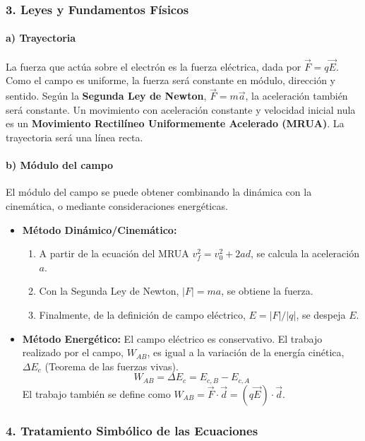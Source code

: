 \subsubsection*{3. Leyes y Fundamentos Físicos}
\paragraph*{a) Trayectoria}
La fuerza que actúa sobre el electrón es la fuerza eléctrica, dada por $\vec{F} = q\vec{E}$. Como el campo es uniforme, la fuerza será constante en módulo, dirección y sentido. Según la \textbf{Segunda Ley de Newton}, $\vec{F} = m\vec{a}$, la aceleración también será constante. Un movimiento con aceleración constante y velocidad inicial nula es un \textbf{Movimiento Rectilíneo Uniformemente Acelerado (MRUA)}. La trayectoria será una línea recta.

\paragraph*{b) Módulo del campo}
El módulo del campo se puede obtener combinando la dinámica con la cinemática, o mediante consideraciones energéticas.
\begin{itemize}
    \item \textbf{Método Dinámico/Cinemático:}
        \begin{enumerate}
            \item A partir de la ecuación del MRUA $v_f^2 = v_0^2 + 2ad$, se calcula la aceleración $a$.
            \item Con la Segunda Ley de Newton, $|F| = ma$, se obtiene la fuerza.
            \item Finalmente, de la definición de campo eléctrico, $E = |F|/|q|$, se despeja $E$.
        \end{enumerate}
    \item \textbf{Método Energético:}
        El campo eléctrico es conservativo. El trabajo realizado por el campo, $W_{AB}$, es igual a la variación de la energía cinética, $\Delta E_c$ (Teorema de las fuerzas vivas).
        $$W_{AB} = \Delta E_c = E_{c,B} - E_{c,A}$$
        El trabajo también se define como $W_{AB} = \vec{F} \cdot \vec{d} = (q\vec{E}) \cdot \vec{d}$.
\end{itemize}

\subsubsection*{4. Tratamiento Simbólico de las Ecuaciones}

